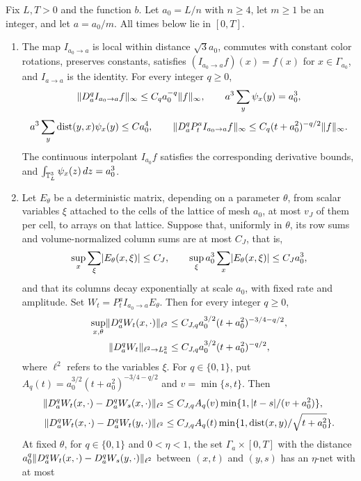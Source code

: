 \begin{lemma}\label{ch13:lem:cardinal-columns}
Fix $L,T>0$ and the function $b$. Let $a_0=L/n$ with $n\ge4$, let $m\ge1$ be an integer, and let $a=a_0/m$. All times below lie in $[0,T]$.
\begin{enumerate}
\item The map $I_{a_0\to a}$ is local within distance $\sqrt3a_0$, commutes with constant color rotations, preserves constants, satisfies $(I_{a_0\to a}f)(x)=f(x)$ for $x\in\Gamma_{a_0}$, and $I_{a\to a}$ is the identity. For every integer $q\ge0$,
\[
 \lVert D_a^qI_{a_0\to a}f\rVert_\infty\le C_qa_0^{-q}\lVert f\rVert_\infty,\qquad a^3\sum_y\psi_x(y)=a_0^3,
\]
\[
 a^3\sum_y\operatorname{dist}(y,x)\psi_x(y)\le Ca_0^4,\qquad\lVert D_a^qP_t^aI_{a_0\to a}f\rVert_\infty\le C_q(t+a_0^2)^{-q/2}\lVert f\rVert_\infty.
\]
The continuous interpolant $I_{a_0}f$ satisfies the corresponding derivative bounds, and $\int_{\mathbb T_L^3}\psi_x(z)\,dz=a_0^3$.
\item Let $E_\theta$ be a deterministic matrix, depending on a parameter $\theta$, from scalar variables $\xi$ attached to the cells of the lattice of mesh $a_0$, at most $v_J$ of them per cell, to arrays on that lattice. Suppose that, uniformly in $\theta$, its row sums and volume-normalized column sums are at most $C_J$, that is,
\begin{equation}\label{ch13:eq:coefficient-hypotheses}
 \sup_x\sum_\xi\lvert E_\theta(x,\xi)\rvert\le C_J,\qquad\sup_\xi a_0^3\sum_x\lvert E_\theta(x,\xi)\rvert\le C_Ja_0^3,
\end{equation}
and that its columns decay exponentially at scale $a_0$, with fixed rate and amplitude. Set $W_t=P_t^aI_{a_0\to a}E_\theta$. Then for every integer $q\ge0$,
\[
 \begin{gathered}
 \sup_{x,\theta}\lVert D_a^qW_t(x,\cdot)\rVert_{\ell^2}\le C_{J,q}a_0^{3/2}(t+a_0^2)^{-3/4-q/2},\\
 \lVert D_a^qW_t\rVert_{\ell^2\to L^2_a}\le C_{J,q}a_0^{3/2}(t+a_0^2)^{-q/2},
 \end{gathered}
\]
where $\ell^2$ refers to the variables $\xi$. For $q\in\{0,1\}$, put $A_q(t)=a_0^{3/2}(t+a_0^2)^{-3/4-q/2}$ and $v=\min\{s,t\}$. Then
\[
 \begin{split}
 \lVert D_a^qW_t(x,\cdot)-D_a^qW_s(x,\cdot)\rVert_{\ell^2}&\le C_{J,q}A_q(v)\min\{1,\lvert t-s\rvert/(v+a_0^2)\},\\
 \lVert D_a^qW_t(x,\cdot)-D_a^qW_t(y,\cdot)\rVert_{\ell^2}&\le C_{J,q}A_q(t)\min\{1,\operatorname{dist}(x,y)/\sqrt{t+a_0^2}\}.
 \end{split}
\]
At fixed $\theta$, for $q\in\{0,1\}$ and $0<\eta<1$, the set $\Gamma_a\times[0,T]$ with the distance $a_0^q\lVert D_a^qW_t(x,\cdot)-D_a^qW_s(y,\cdot)\rVert_{\ell^2}$ between $(x,t)$ and $(y,s)$ has an $\eta$-net with at most

\end{enumerate}
\end{lemma}
